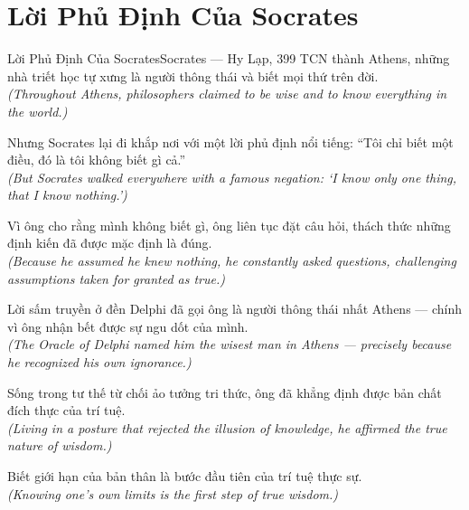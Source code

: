 \section{Lời Phủ Định Của Socrates}
\begin{truyen}{Lời Phủ Định Của Socrates}{Socrates --- Hy Lạp, 399 TCN}
 thành Athens, những nhà triết học tự xưng là người thông thái và biết mọi thứ trên đời.\\[4pt]
\textit{(Throughout Athens, philosophers claimed to be wise and to know everything in the world.)}

Nhưng Socrates lại đi khắp nơi với một lời phủ định nổi tiếng: ``Tôi chỉ biết một điều, đó là tôi không biết gì cả.''\\[4pt]
\textit{(But Socrates walked everywhere with a famous negation: `I know only one thing, that I know nothing.')}

Vì ông cho rằng mình không biết gì, ông liên tục đặt câu hỏi, thách thức những định kiến đã được mặc định là đúng.\\[4pt]
\textit{(Because he assumed he knew nothing, he constantly asked questions, challenging assumptions taken for granted as true.)}

Lời sấm truyền ở đền Delphi đã gọi ông là người thông thái nhất Athens --- chính vì ông nhận bết được sự ngu dốt của mình.\\[4pt]
\textit{(The Oracle of Delphi named him the wisest man in Athens --- precisely because he recognized his own ignorance.)}

Sống trong tư thế từ chối ảo tưởng tri thức, ông đã khẳng định được bản chất đích thực của trí tuệ.\\[4pt]
\textit{(Living in a posture that rejected the illusion of knowledge, he affirmed the true nature of wisdom.)}

\end{truyen}
\begin{baihoc}
  Biết giới hạn của bản thân là bước đầu tiên của trí tuệ thực sự.\\[4pt]
  \textit{(Knowing one's own limits is the first step of true wisdom.)}
\end{baihoc}

